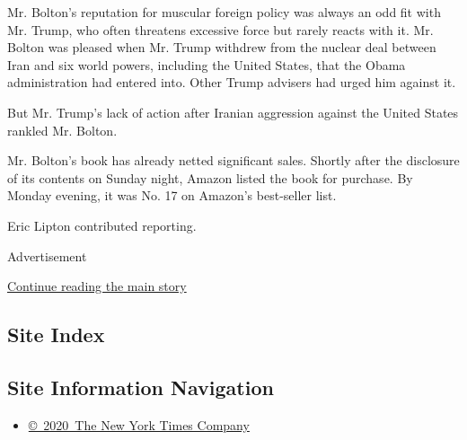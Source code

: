 Mr. Bolton's reputation for muscular foreign policy was always an odd
fit with Mr. Trump, who often threatens excessive force but rarely
reacts with it. Mr. Bolton was pleased when Mr. Trump withdrew from the
nuclear deal between Iran and six world powers, including the United
States, that the Obama administration had entered into. Other Trump
advisers had urged him against it.

But Mr. Trump's lack of action after Iranian aggression against the
United States rankled Mr. Bolton.

Mr. Bolton's book has already netted significant sales. Shortly after
the disclosure of its contents on Sunday night, Amazon listed the book
for purchase. By Monday evening, it was No. 17 on Amazon's best-seller
list.

Eric Lipton contributed reporting.

Advertisement

\protect\hyperlink{after-bottom}{Continue reading the main story}

\hypertarget{site-index}{%
\subsection{Site Index}\label{site-index}}

\hypertarget{site-information-navigation}{%
\subsection{Site Information
Navigation}\label{site-information-navigation}}

\begin{itemize}
\tightlist
\item
  \href{https://help.nytimes3xbfgragh.onion/hc/en-us/articles/115014792127-Copyright-notice}{©~2020~The
  New York Times Company}
\end{itemize}

